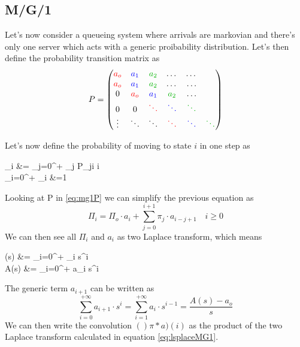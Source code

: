 \subsection{M/G/1}
Let's now consider a queueing system where arrivals are markovian and there's only one server which acts with a generic proibability distribution. Let's then define the probability transition matrix as
\begin{equation}\label{eq:mg1P}
	P=\begin{pmatrix}
 \color{red}{a_o}& \color{blue}{a_1} & \color[rgb]{0,0.7,0}{a_2} & \dots &\dots & \\
 \color{red}{a_o}& \color{blue}{a_1} & \color[rgb]{0,0.7,0}{a_2}& \dots & \dots \\
 0  & \color{red}{a_o}& \color{blue}{a_1} & \color[rgb]{0,0.7,0}{a_2} & \dots \\
 0 & 0 & \color{red}{\ddots} & \color{blue}{\ddots} &\color[rgb]{0,0.7,0}{\ddots} \\
\vdots & \ddots &\ddots & \color{red}{\ddots} & \color{blue}{\ddots} &\color[rgb]{0,0.7,0}{\ddots} \\

\end{pmatrix}
\end{equation}

Let's now define the probability of moving to state $i$ in one step as
\begin{esp}
	\Pi_i &= \sum\limits_{j=0}^{+\infty} \pi_j \cdot P_{ji} \quad \forall i \\
	\sum\limits_{i=0}^{+\infty} \pi_i &=1
\end{esp}
Looking at P in \eqref{eq:mg1P} we can simplify the previous equation as
\begin{equation}
	\Pi_i = \Pi_o \cdot a_i +  \sum\limits_{j=0}^{i+1} \pi_j \cdot a_{i-j+1}\quad i \ge 0
\end{equation}
We can then see all $\Pi_i$ and $a_i$ as two Laplace transform, which means
\begin{esp}\label{eq:lsplaceMG1}
	\Pi(s) &= \sum\limits_{i=0}^{+\infty} \pi_i \cdot s^i \\
	A(s) &= \sum\limits_{i=0}^{+\infty} a_i \cdot s^i \\
\end{esp}
The generic term $a_{i+1}$ can be written as
\begin{equation*}
	\sum\limits_{i=0}^{+\infty} a_{i+1} \cdot s^i =\sum\limits_{i=1}^{+\infty} a_i \cdot s^{i-1} = \frac{A(s) - a_o}{s}
\end{equation*}
We can then write the convolution $()\pi * a) (i)$ as the product of the two Laplace transform calculated in equation \eqref{eq:lsplaceMG1}.

